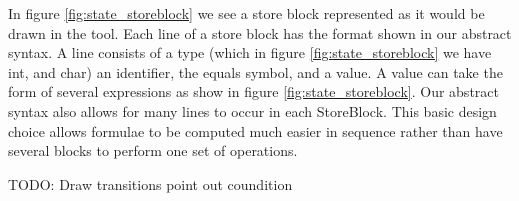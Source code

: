 In figure \ref{fig:state_storeblock} we see a store block represented as it would be drawn in the tool. Each line of a store block has the format shown in our abstract syntax. A line consists of a type (which in figure \ref{fig:state_storeblock} we have int, and char) an identifier, the equals symbol, and a value. A value can take the form of several expressions as show in figure \ref{fig:state_storeblock}. Our abstract syntax also allows for many lines to occur in each StoreBlock. This basic design choice allows formulae to be computed much easier in sequence rather than have several blocks to perform one set of operations.

TODO: Draw transitions point out coundition

